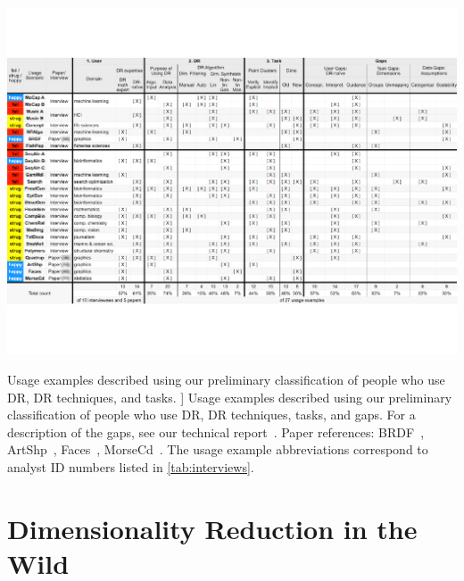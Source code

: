 \begin{table}
    \centering
    \includegraphics[width=\textwidth]{figures/dritw-table-1.pdf}
    \caption
    [
        Usage examples described using our preliminary classification of people who use \ac{DR}, \ac{DR} techniques, and tasks. 
    ]
    {
        Usage examples described using our preliminary classification of people who use \ac{DR}, \ac{DR} techniques, tasks, and gaps. For a description of the gaps, see our technical report~\cite{Sedlmair2012b}. Paper references: {\sc BRDF}~\cite{Matusik2003}, {\sc ArtShp}~\cite{Bronstein2006}, {\sc Faces}~\cite{Tenenbaum2000}, {\sc MorseCd}~\cite{Buja2002}. The usage example abbreviations correspond to analyst ID numbers listed in \autoref{tab:interviews}. 
    }
    \label{table:dritw-table-1}
    \centering
\end{table}



\section{Dimensionality Reduction in the Wild}
\label{app:drvistasks:dritw}


